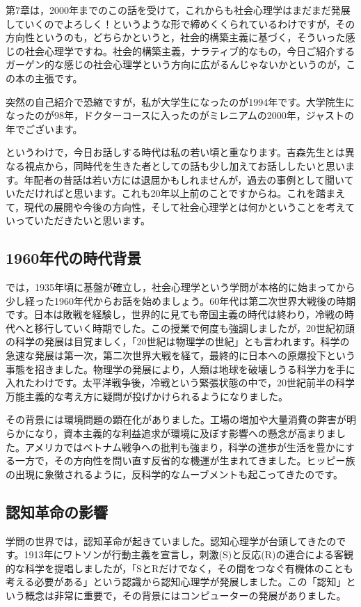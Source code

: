 \documentclass{ltjsbook}
\begin{document}
第7章は，2000年までのこの話を受けて，これからも社会心理学はまだまだ発展していくのでよろしく！というような形で締めくくられているわけですが，その方向性というのも，どちらかというと，社会的構築主義に基づく，そういった感じの社会心理学ですね。社会的構築主義，ナラティブ的なもの，今日ご紹介するガーゲン的な感じの社会心理学という方向に広がるんじゃないかというのが，この本の主張です。

突然の自己紹介で恐縮ですが，私が大学生になったのが1994年です。大学院生になったのが98年，ドクターコースに入ったのがミレニアムの2000年，ジャストの年でございます。

というわけで，今日お話しする時代は私の若い頃と重なります。吉森先生とは異なる視点から，同時代を生きた者としての話も少し加えてお話ししたいと思います。年配者の昔話は若い方には退屈かもしれませんが，過去の事例として聞いていただければと思います。これも20年以上前のことですからね。これを踏まえて，現代の展開や今後の方向性，そして社会心理学とは何かということを考えていっていただきたいと思います。

\subsection{1960年代の時代背景}
では，1935年頃に基盤が確立し，社会心理学という学問が本格的に始まってから少し経った1960年代からお話を始めましょう。60年代は第二次世界大戦後の時期です。日本は敗戦を経験し，世界的に見ても帝国主義の時代は終わり，冷戦の時代へと移行していく時期でした。この授業で何度も強調しましたが，20世紀初頭の科学の発展は目覚ましく，「20世紀は物理学の世紀」とも言われます。科学の急速な発展は第一次，第二次世界大戦を経て，最終的に日本への原爆投下という事態を招きました。物理学の発展により，人類は地球を破壊しうる科学力を手に入れたわけです。太平洋戦争後，冷戦という緊張状態の中で，20世紀前半の科学万能主義的な考え方に疑問が投げかけられるようになりました。

その背景には環境問題の顕在化がありました。工場の増加や大量消費の弊害が明らかになり，資本主義的な利益追求が環境に及ぼす影響への懸念が高まりました。アメリカではベトナム戦争への批判も強まり，科学の進歩が生活を豊かにする一方で，その方向性を問い直す反省的な機運が生まれてきました。ヒッピー族の出現に象徴されるように，反科学的なムーブメントも起こってきたのです。

\subsection{認知革命の影響}

学問の世界では，認知革命が起きていました。認知心理学が台頭してきたのです。1913年にワトソンが行動主義を宣言し，刺激(S)と反応(R)の連合による客観的な科学を提唱しましたが，「SとRだけでなく，その間をつなぐ有機体のことも考える必要がある」という認識から認知心理学が発展しました。この「認知」という概念は非常に重要で，その背景にはコンピューターの発展がありました。
\end{document}
